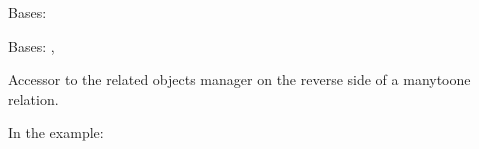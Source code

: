 \documentclass[letterpaper,10pt,english]{sphinxmanual}
\begin{document}
\begin{fulllineitems}
\begin{fulllineitems}
\label{\detokenize{expensesApp:expensesApp.models.Cycle.MultipleObjectsReturned}}
\pysigstartsignatures
\pysigline
{}
\pysigstopsignatures
\sphinxAtStartPar
Bases: 

\end{fulllineitems}


\begin{fulllineitems}
\label{\detokenize{expensesApp:expensesApp.models.Cycle.NotUpdated}}
\pysigstartsignatures
\pysigline
{}
\pysigstopsignatures
\sphinxAtStartPar
Bases: , 

\end{fulllineitems}


\begin{fulllineitems}
\label{\detokenize{expensesApp:expensesApp.models.Cycle._meta}}
\pysigstartsignatures
\pysigline
{}
\pysigstopsignatures
\end{fulllineitems}


\begin{fulllineitems}
\label{\detokenize{expensesApp:expensesApp.models.Cycle.expense_set}}
\pysigstartsignatures
\pysigline
{}
\pysigstopsignatures
\sphinxAtStartPar
Accessor to the related objects manager on the reverse side of a
many\sphinxhyphen{}to\sphinxhyphen{}one relation.

\sphinxAtStartPar
In the example:

\begin{sphinxVerbatim}[commandchars=\\\{\}]
       
\end{sphinxVerbatim}


\end{fulllineitems}
\end{fulllineitems}
\end{document}

